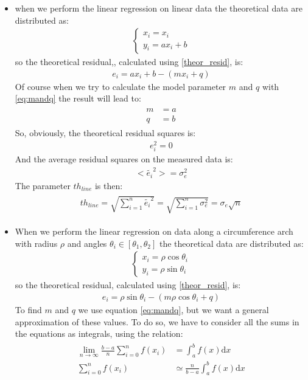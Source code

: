 \begin{itemize}
\begin{itemize}
\item when we perform the linear regression on linear data the theoretical data are distributed as:
\begin{align*}
\begin{cases}
x_i = x_i \\[10pt]
y_i = ax_i + b
\end{cases}
\end{align*} 
so the theoretical residual,, calculated using \ref{theor_resid}, is: 
\begin{align*}
e_i = ax_i + b - (mx_i + q)
\end{align*}
Of course when we try to calculate the model parameter $m$ and $q$ with \ref{eq:mandq}  the result will lead to:
 \begin{align}
\begin{split}
m &= a  \\[5pt]
q &= b
\end{split}
\label{eq:mandqcirum}
\end{align}
So, obviously, the theoretical residual squares is:
\begin{align*}
e_i^2  = 0
\end{align*} 
And the average residual squares on the measured data is:
\begin{align*}
<\tilde{e_i}^2>  = \sigma_e^2
\end{align*} 
The parameter $th_{line}$ is then:
\begin{align}
\begin{split}
th_{line} = \sqrt{\sum_{i=1}^{n}{\tilde{e_i}^2}} = \sqrt{\sum_{i=1}^{n}{\sigma_e^2}} = \sigma_e\sqrt{n}
\end{split}
\end{align}
\item When we perform the linear regression on data along a circumference arch with radius $\rho$ and angles $\theta_i \in [\theta_1,\theta_2]$ the theoretical data are distributed as:
\begin{align*}
\begin{cases}
x_i = \rho\cos{\theta_i}\\[10pt]
y_i = \rho\sin{\theta_i}
\end{cases}
\end{align*} 
so the theoretical residual, calculated using \ref{theor_resid}, is:
\begin{align*}
e_i = \rho\sin{\theta_i} - (m\rho\cos{\theta_i} + q)
\end{align*}
To find $m$ and $q$ we use equation \ref{eq:mandq}, but we want a general approximation of these values. To do so, we have  to consider all the sums in the equations as integrals, using the relation:
\begin{align}
\begin{split}
\lim_{n \to \infty} { \frac{b-a}{n} \sum_{i=0}^{n}{f(x_i)}} &=   \int_a^b{f(x )\mathrm  {d}x} \\[10pt]
 \sum_{i=0}^{n}{f(x_i)} &\simeq \frac{n}{b-a} \int_a^b{f(x )\mathrm  {d}x}
\end{split}
\label{eq:integralsandsums}
\end{align} 


\end{itemize}
\end{itemize}

